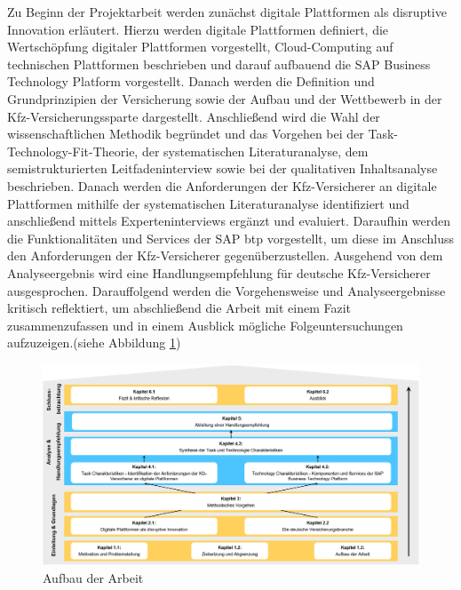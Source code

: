 Zu Beginn der Projektarbeit werden zunächst digitale Plattformen als disruptive Innovation erläutert. Hierzu werden digitale Plattformen definiert, die Wertschöpfung digitaler Plattformen vorgestellt, Cloud-Computing auf technischen Plattformen beschrieben und darauf aufbauend die SAP Business Technology Platform vorgestellt. Danach werden die Definition und Grundprinzipien der Versicherung sowie der Aufbau und der Wettbewerb in der Kfz-Versicherungssparte dargestellt. Anschließend wird die Wahl der wissenschaftlichen Methodik begründet und das Vorgehen bei der Task-Technology-Fit-Theorie, der systematischen Literaturanalyse, dem semistrukturierten Leitfadeninterview sowie bei der qualitativen Inhaltsanalyse beschrieben. Danach werden die Anforderungen der Kfz-Versicherer an digitale Plattformen mithilfe der systematischen Literaturanalyse identifiziert und anschließend mittels Experteninterviews ergänzt und evaluiert. Daraufhin werden die Funktionalitäten und Services der SAP \ac{btp} vorgestellt, um diese im Anschluss den Anforderungen der Kfz-Versicherer gegenüberzustellen. Ausgehend von dem Analyseergebnis wird eine Handlungsempfehlung für deutsche Kfz-Versicherer ausgesprochen. Darauffolgend werden die Vorgehensweise und Analyseergebnisse kritisch reflektiert, um abschließend die Arbeit mit einem Fazit zusammenzufassen und in einem Ausblick mögliche Folgeuntersuchungen aufzuzeigen.(siehe Abbildung \ref{fig:Aufbau})


\begin{figure}[h]
    \centering
    \includegraphics[width=1\textwidth]{img/Aufbau_der_Arbeit.jpg}
    \caption[Aufbau der Arbeit]{Aufbau der Arbeit\autocite{Aufbau}}
    \label{fig:Aufbau}
\end{figure}


\newpage